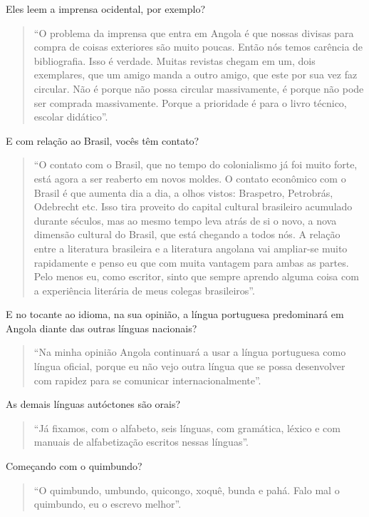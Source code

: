 \documentclass[
  letterpaper,
  DIV=11,
  numbers=noendperiod]{scrreprt}
\begin{document}
Eles leem a imprensa ocidental, por exemplo?

\begin{quote}
``O problema da imprensa que entra em Angola é que nossas divisas para
compra de coisas exteriores são muito poucas. Então nós temos carência
de bibliografia. Isso é verdade. Muitas revistas chegam em um, dois
exemplares, que um amigo manda a outro amigo, que este por sua vez faz
circular. Não é porque não possa circular massivamente, é porque não
pode ser comprada massivamente. Porque a prioridade é para o livro
técnico, escolar didático''.
\end{quote}

E com relação ao Brasil, vocês têm contato?

\begin{quote}
``O contato com o Brasil, que no tempo do colonialismo já foi muito
forte, está agora a ser reaberto em novos moldes. O contato econômico
com o Brasil é que aumenta dia a dia, a olhos vistos: Braspetro,
Petrobrás, Odebrecht etc. Isso tira proveito do capital cultural
brasileiro acumulado durante séculos, mas ao mesmo tempo leva atrás de
si o novo, a nova dimensão cultural do Brasil, que está chegando a todos
nós. A relação entre a literatura brasileira e a literatura angolana vai
ampliar-se muito rapidamente e penso eu que com muita vantagem para
ambas as partes. Pelo menos eu, como escritor, sinto que sempre aprendo
alguma coisa com a experiência literária de meus colegas brasileiros''.
\end{quote}

E no tocante ao idioma, na sua opinião, a língua portuguesa predominará
em Angola diante das outras línguas nacionais?

\begin{quote}
``Na minha opinião Angola continuará a usar a língua portuguesa como
língua oficial, porque eu não vejo outra língua que se possa desenvolver
com rapidez para se comunicar internacionalmente''.
\end{quote}

As demais línguas autóctones são orais?

\begin{quote}
``Já fixamos, com o alfabeto, seis línguas, com gramática, léxico e com
manuais de alfabetização escritos nessas línguas''.
\end{quote}

Começando com o quimbundo?

\begin{quote}
``O quimbundo, umbundo, quicongo, xoquê, bunda e pahá. Falo mal o
quimbundo, eu o escrevo melhor''.
\end{quote}
\end{document}

